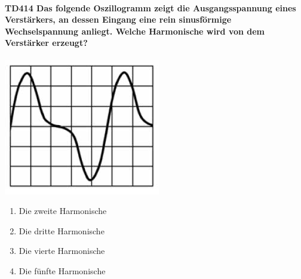 \documentclass[8pt]{article}
\begin{document}
\begin{enumerate}
\begin{enumerate}[nolistsep,label=\Alph*]
\paragraph*{TD414 Das folgende Oszillogramm zeigt die Ausgangsspannung eines Verstärkers, an dessen Eingang eine rein sinusförmige Wechselspannung anliegt. Welche Harmonische wird von dem Verstärker erzeugt?}
\begin{center}
	\begin{minipage}{\linewidth}
		\centering
		\includegraphics[scale=1.0]{pics/td414_a.jpg}
	\end{minipage}
\end{center}
\begin{enumerate}[nolistsep,label=\Alph*]
\item Die zweite Harmonische
\item Die dritte Harmonische
\item Die vierte Harmonische
\item Die fünfte Harmonische
\end{enumerate}


\end{enumerate}
\end{enumerate}
\end{document}
